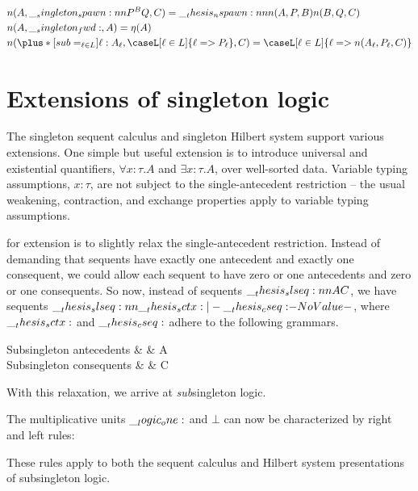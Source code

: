 \begin{equation*}
  \begin{lgathered}
    n(A, \spawn{P}{^B Q}, C) = \nspawn{n(A, P, B)}{n(B, Q, C)} \\
    n(A, \fwd, A) = \eta(A) \\
    n(\plus*[sub=_{\ell \in L}]{\ell:A_{\ell}}, \caseL[\ell \in L]{\ell => P_{\ell}}, C) = \caseL[\ell \in L]{\ell => n(A_{\ell}, P_{\ell}, C)}
  \end{lgathered}
\end{equation*}





\section{Extensions of singleton logic}\label{sec:singleton-logic:extensions}

The singleton sequent calculus and singleton Hilbert system support various extensions.
One simple but useful extension is to introduce universal and existential quantifiers, $\forall x{:}\tau.A$ and $\exists x{:}\tau.A$, over well-sorted data.
Variable typing assumptions, $x{:}\tau$, are not subject to the single-antecedent restriction -- the usual weakening, contraction, and exchange properties apply to variable typing assumptions.

 for extension is to slightly relax the single-antecedent restriction.
Instead of demanding that sequents have exactly one antecedent and exactly one consequent, we could allow each sequent to have zero or one antecedents and zero or one consequents.
So now, instead of sequents $\slseq{A |- C}$, we have sequents $\slseq{\sctx |- \cseq}$, where $\__thesis_sctx:$ and $\__thesis_cseq:$ adhere to the following grammars.
\begin{syntax*}
  Subsingleton antecedents & \sctx & A \mid \sctxe \\
  Subsingleton conseq{}uents & \cseq & C \mid \cseqe
\end{syntax*}
With this relaxation, we arrive at \emph{sub}singleton logic.

The multiplicative units $\__logic_one:$ and $\bot$ can now be characterized by right and left rules:
\begin{inferences}
  \infer[\rrule{\one}]{\slseq{\sctxe |- \one}}{}
  \and
  \infer[\lrule{\one}]{\slseq{\one |- \cseq}}{
    \slseq{\sctxe |- \cseq}}
  \\
  \infer[\rrule{\bot}]{\slseq{\sctx |- \bot}}{
    \slseq{\sctx |- \cseqe}}
  \and
  \infer[\lrule{\bot}]{\slseq{\bot |- \cseqe}}{}
\end{inferences}
These rules apply to both the sequent calculus and Hilbert system presentations of subsingleton logic.

